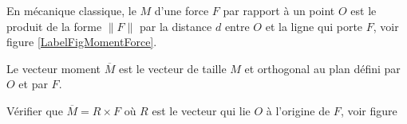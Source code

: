 
\begin{exercice}\label{exoOutilsMath-0075}

    En mécanique classique, le  $M$ d'une force $F$ par rapport à un point $O$ est le produit de la forme $\| F \|$ par la distance $d$ entre $O$ et la ligne qui porte $F$, voir figure \ref{LabelFigMomentForce}.

    Le vecteur moment $\overline{ M }$ est le vecteur de taille $M$ et orthogonal au plan défini par $O$ et par $F$.

    Vérifier que $\overline{ M }=R\times F$ où $R$ est le vecteur qui lie $O$ à l'origine de $F$, voir figure 

    
\newcommand{\CaptionFigMomentForce}{Moment de force.}



\end{exercice}
